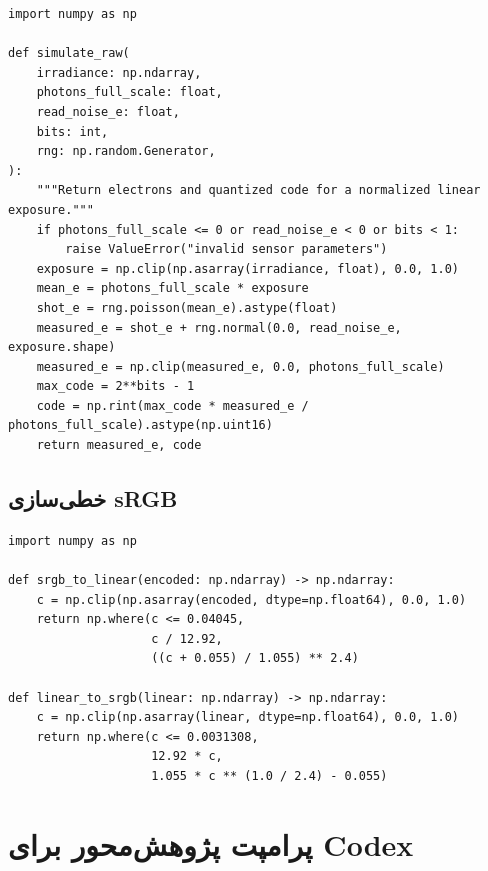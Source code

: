 \begin{LTR}
\begin{lstlisting}
import numpy as np

def simulate_raw(
    irradiance: np.ndarray,
    photons_full_scale: float,
    read_noise_e: float,
    bits: int,
    rng: np.random.Generator,
):
    """Return electrons and quantized code for a normalized linear exposure."""
    if photons_full_scale <= 0 or read_noise_e < 0 or bits < 1:
        raise ValueError("invalid sensor parameters")
    exposure = np.clip(np.asarray(irradiance, float), 0.0, 1.0)
    mean_e = photons_full_scale * exposure
    shot_e = rng.poisson(mean_e).astype(float)
    measured_e = shot_e + rng.normal(0.0, read_noise_e, exposure.shape)
    measured_e = np.clip(measured_e, 0.0, photons_full_scale)
    max_code = 2**bits - 1
    code = np.rint(max_code * measured_e / photons_full_scale).astype(np.uint16)
    return measured_e, code
\end{lstlisting}
\end{LTR}

\subsection{خطی‌سازی sRGB}

\begin{LTR}
\begin{lstlisting}
import numpy as np

def srgb_to_linear(encoded: np.ndarray) -> np.ndarray:
    c = np.clip(np.asarray(encoded, dtype=np.float64), 0.0, 1.0)
    return np.where(c <= 0.04045,
                    c / 12.92,
                    ((c + 0.055) / 1.055) ** 2.4)

def linear_to_srgb(linear: np.ndarray) -> np.ndarray:
    c = np.clip(np.asarray(linear, dtype=np.float64), 0.0, 1.0)
    return np.where(c <= 0.0031308,
                    12.92 * c,
                    1.055 * c ** (1.0 / 2.4) - 0.055)
\end{lstlisting}
\end{LTR}

\section{پرامپت پژوهش‌محور برای Codex}

